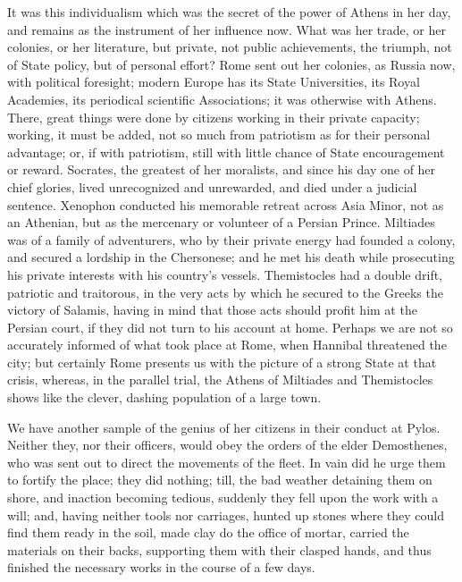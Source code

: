 It was this individualism which was the secret of
the power of Athens in her day, and remains as the instrument of her
influence now. What was her trade, or her colonies, or her literature,
but private, not public achievements, the triumph, not of State
policy, but of personal effort? Rome sent out her colonies, as Russia
now, with political foresight; modern Europe has its State
Universities, its Royal Academies, its periodical scientific
Associations; it was otherwise with Athens. There, great things were
done by citizens working in their private capacity; working, it must
be added, not so much from patriotism as for their personal advantage;
or, if with patriotism, still with little chance of State
encouragement or reward. Socrates, the greatest of her moralists, and
since his day one of her chief glories, lived unrecognized and
unrewarded, and died under a judicial sentence. Xenophon conducted his
memorable retreat across Asia Minor, not as an Athenian, but as the
mercenary or volunteer of a Persian Prince. Miltiades was of a family
of adventurers, who by their private energy had founded a colony, and
secured a lordship in the Chersonese; and he met his death while
prosecuting his private interests with his country's vessels.
Themistocles had a double drift, patriotic and traitorous, in the very
acts by which he secured to the Greeks the victory of Salamis, having
in mind that those acts should profit him at the Persian court, if
they did not turn to his account at home. Perhaps we are not so
accurately informed of what took place at Rome, when Hannibal
threatened the city; but certainly Rome presents us with the picture
of a strong State at that crisis, whereas, in the parallel trial, the
Athens of Miltiades and Themistocles shows like the clever, dashing
population of a large town.

We have another sample of the genius of her
citizens in their conduct at Pylos. Neither they, nor their officers,
would obey the orders of the elder Demosthenes, who was sent out to
direct the movements of the fleet. In vain did he urge them to fortify
the place; they did nothing; till, the bad weather detaining them on
shore, and inaction becoming tedious, suddenly they fell upon the work
with a will; and, having neither tools nor carriages, hunted up stones
where they could find them ready in the soil, made clay do the office
of mortar, carried the materials on their backs, supporting them with
their clasped hands, and thus finished the necessary works in the
course of a few days.

